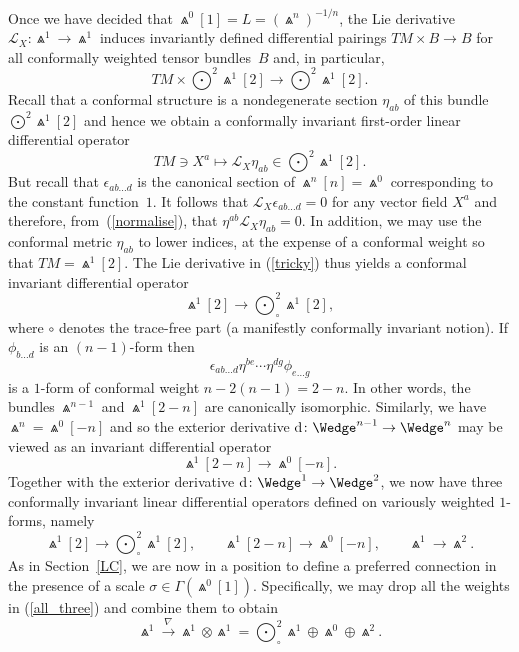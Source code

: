 \documentclass[pdftex]{sigma}%
\numberwithin{equation}{section}
\begin{document}
Once we have decided that $\Wedge^0[1]=L=(\Wedge^n)^{-1/n}$, the Lie
derivative ${\mathcal{L}}_X\colon \Wedge^1\to\Wedge^1$ induces invariantly
defined differential pairings $TM\times B\to B$ for all conformally weighted
tensor bundles~$B$ and, in particular,
\[\textstyle TM\times\bigodot^2\!\Wedge^1[2]\to\bigodot^2\!\Wedge^1[2].\]
Recall that a conformal structure is a nondegenerate section $\eta_{ab}$
of this bundle $\bigodot^2\!\Wedge^1[2]$
and hence we obtain a conformally invariant first-order linear differential
operator
\begin{equation}\label{tricky}\textstyle
TM\ni X^a\longmapsto{\mathcal{L}}_X\eta_{ab}\in\bigodot^2\!\Wedge^1[2].
\end{equation}
But recall that $\epsilon_{ab\dots d}$ is the canonical section of
$\Wedge^n[n]=\Wedge^0$ corresponding to the constant function~$1$. It follows
that ${\mathcal{L}}_X\epsilon_{ab\dots d}=0$ for any vector field $X^a$ and
therefore, from~(\ref{normalise}), that $\eta^{ab}{\mathcal{L}}_X\eta_{ab}=0$.
In addition, we may use the conformal metric $\eta_{ab}$ to lower indices, at
the expense of a conformal weight so that $TM=\Wedge^1[2]$. The Lie derivative
in (\ref{tricky}) thus yields a conformal invariant differential operator
\[\textstyle\Wedge^1[2]\longrightarrow\bigodot_\circ^2\!\Wedge^1[2],\]
where $\circ$ denotes the trace-free part (a manifestly conformally invariant
notion). If $\phi_{b\dots d}$ is an $(n-1)$-form then
\[\epsilon_{ab\dots d}\eta^{be}\cdots\eta^{dg}\phi_{e\dots g}\]
is a $1$-form of conformal weight $n-2(n-1)=2-n$. In other words, the bundles
$\Wedge^{n-1}$ and $\Wedge^1[2-n]$ are canonically isomorphic. Similarly, we
have $\Wedge^n=\Wedge^0[-n]$ and so the exterior derivative
${\rm d}\colon \Wedge^{n-1}\to\Wedge^n$ may be viewed as an invariant differential operator
\[\Wedge^1[2-n]\to\Wedge^0[-n].\]
Together with the exterior derivative ${\rm d}\colon \Wedge^1\to\Wedge^2$, we now have
three conformally invariant linear differential operators defined on variously
weighted $1$-forms, namely
\begin{equation}\label{all_three}\textstyle
\Wedge^1[2]\to\bigodot_\circ^2\!\Wedge^1[2],
\qquad\Wedge^1[2-n]\to\Wedge^0[-n],\qquad\Wedge^1\to\Wedge^2.\end{equation}
As in Section~\ref{LC}, we are now in a position to define a preferred
connection in the presence of a scale $\sigma\in\Gamma(\Wedge^0[1])$.
Specifically, we may drop all the weights in (\ref{all_three}) and combine
them to obtain
\[\textstyle\Wedge^1\xrightarrow{\,\nabla\,}\Wedge^1\otimes\Wedge^1
=\bigodot_\circ^2\!\Wedge^1\oplus\Wedge^0\oplus\Wedge^2.\]
\end{document}

